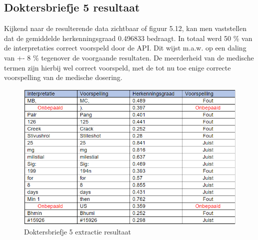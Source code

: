 \subsection{Doktersbriefje 5 resultaat}
Kijkend naar de resulterende data zichtbaar of figuur 5.12, kan men vaststellen dat de gemiddelde herkenningsgraad 0.496833 bedraagt. In totaal werd 50 \% van de interpretaties correct voorspeld door de API. Dit wijst m.a.w. op een daling van +- 8 \% tegenover de voorgaande resultaten. De meerderheid van de medische termen zijn hierbij wel correct voorspeld, met de tot nu toe enige correcte voorspelling van de medische dosering. 
\begin{figure}[h]
	
	\includegraphics[width=\textwidth,height=\textheight,keepaspectratio]{../Foto's/doktersbriefje5_tabel}
		\captionsetup{justification=centering,margin=2cm}
	\caption{Doktersbriefje 5 extractie resultaat}
	\centering
\end{figure}
\clearpage
